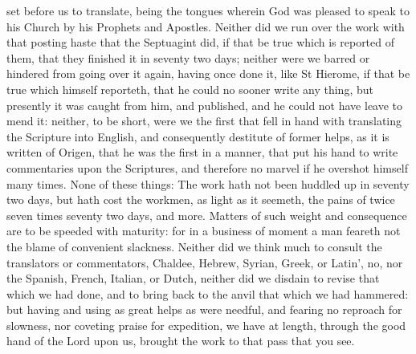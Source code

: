 set before us to translate, being the tongues wherein God was pleased to speak to his Church by his Prophets and Apostles. Neither did we run over the work with that posting haste that the Septuagint did, if that be true which is reported of them, that they finished it in seventy two days; neither were we barred or hindered from going over it again, having once done it, like St Hierome, if that be true which himself reporteth, that he could no sooner write any thing, but presently it was caught from him, and published, and he could not have leave to mend it: neither, to be short, were we the first that fell in hand with translating the Scripture into English, and consequently destitute of former helps, as it is written of Origen, that he was the first in a manner, that put his hand to write commentaries upon the Scriptures, and therefore no marvel if he overshot himself many times. None of these things: The work hath not been huddled up in seventy two days, but hath cost the workmen, as light as it seemeth, the pains of twice seven times seventy two days, and more. Matters of such weight and consequence are to be speeded with maturity: for in a business of moment a man feareth not the blame of convenient slackness. Neither did we think much to consult the translators or commentators, Chaldee, Hebrew, Syrian, Greek, or Latin', no, nor the Spanish, French, Italian, or Dutch, neither did we disdain to revise that which we had done, and to bring back to the anvil that which we had hammered: but having and using as great helps as were needful, and fearing no reproach for slowness, nor coveting praise for expedition, we have at length, through the good hand of the Lord upon us, brought the work to that pass that you see.

